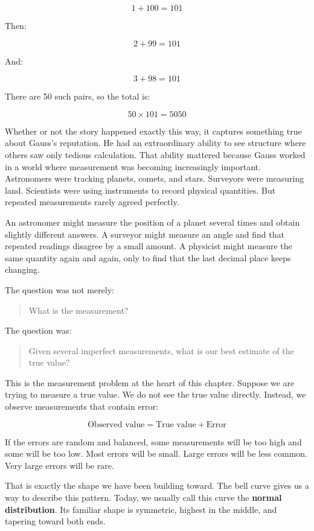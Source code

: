 \documentclass[
  letterpaper,
  DIV=11,
  numbers=noendperiod]{scrreprt}
\begin{document}
\[
1 + 100 = 101
\]

Then:

\[
2 + 99 = 101
\]

And:

\[
3 + 98 = 101
\]

There are 50 such pairs, so the total is:

\[
50 \times 101 = 5050
\]

Whether or not the story happened exactly this way, it captures
something true about Gauss's reputation. He had an extraordinary ability
to see structure where others saw only tedious calculation. That ability
mattered because Gauss worked in a world where measurement was becoming
increasingly important. Astronomers were tracking planets, comets, and
stars. Surveyors were measuring land. Scientists were using instruments
to record physical quantities. But repeated measurements rarely agreed
perfectly.

An astronomer might measure the position of a planet several times and
obtain slightly different answers. A surveyor might measure an angle and
find that repeated readings disagree by a small amount. A physicist
might measure the same quantity again and again, only to find that the
last decimal place keeps changing.

The question was not merely:

\begin{quote}
What is the measurement?
\end{quote}

The question was:

\begin{quote}
Given several imperfect measurements, what is our best estimate of the
true value?
\end{quote}

This is the measurement problem at the heart of this chapter. Suppose we
are trying to measure a true value. We do not see the true value
directly. Instead, we observe measurements that contain error:

\[
\text{Observed value} = \text{True value} + \text{Error}
\]

If the errors are random and balanced, some measurements will be too
high and some will be too low. Most errors will be small. Large errors
will be less common. Very large errors will be rare.

That is exactly the shape we have been building toward. The bell curve
gives us a way to describe this pattern. Today, we usually call this
curve the \textbf{normal distribution}. Its familiar shape is symmetric,
highest in the middle, and tapering toward both ends.
\end{document}
